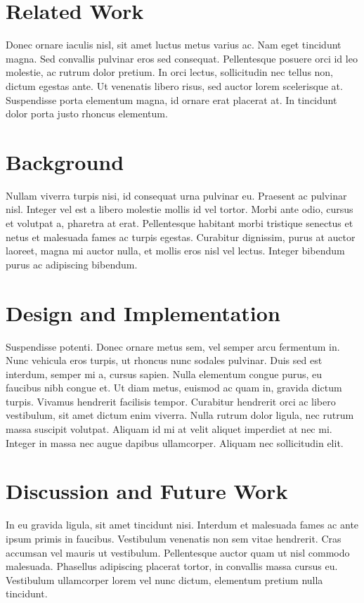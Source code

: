 \documentclass{acm_proc_article-sp}
\begin{document}
\section{Related Work}
Donec ornare iaculis nisl, sit amet luctus metus varius ac. Nam eget tincidunt
magna. Sed convallis pulvinar eros sed consequat. Pellentesque posuere orci id
leo molestie, ac rutrum dolor pretium. In orci lectus, sollicitudin nec tellus
non, dictum egestas ante. Ut venenatis libero risus, sed auctor lorem
scelerisque at. Suspendisse porta elementum magna, id ornare erat placerat at.
In tincidunt dolor porta justo rhoncus elementum.

\section{Background}
Nullam viverra turpis nisi, id consequat urna pulvinar eu. Praesent ac pulvinar
nisl. Integer vel est a libero molestie mollis id vel tortor. Morbi ante odio,
cursus et volutpat a, pharetra at erat. Pellentesque habitant morbi tristique
senectus et netus et malesuada fames ac turpis egestas. Curabitur dignissim,
purus at auctor laoreet, magna mi auctor nulla, et mollis eros nisl vel lectus.
Integer bibendum purus ac adipiscing bibendum.

\section{Design and Implementation}
Suspendisse potenti. Donec ornare metus sem, vel semper arcu fermentum in. Nunc
vehicula eros turpis, ut rhoncus nunc sodales pulvinar. Duis sed est interdum,
semper mi a, cursus sapien. Nulla elementum congue purus, eu faucibus nibh
congue et. Ut diam metus, euismod ac quam in, gravida dictum turpis. Vivamus
hendrerit facilisis tempor. Curabitur hendrerit orci ac libero vestibulum, sit
amet dictum enim viverra. Nulla rutrum dolor ligula, nec rutrum massa suscipit
volutpat. Aliquam id mi at velit aliquet imperdiet at nec mi. Integer in massa
nec augue dapibus ullamcorper. Aliquam nec sollicitudin elit.

\section{Discussion and Future Work}
In eu gravida ligula, sit amet tincidunt nisi. Interdum et malesuada fames ac
ante ipsum primis in faucibus.  Vestibulum venenatis non sem vitae hendrerit.
Cras accumsan vel mauris ut vestibulum. Pellentesque auctor quam ut nisl
commodo malesuada. Phasellus adipiscing placerat tortor, in convallis massa
cursus eu. Vestibulum ullamcorper lorem vel nunc dictum, elementum pretium
nulla tincidunt.
\end{document}
